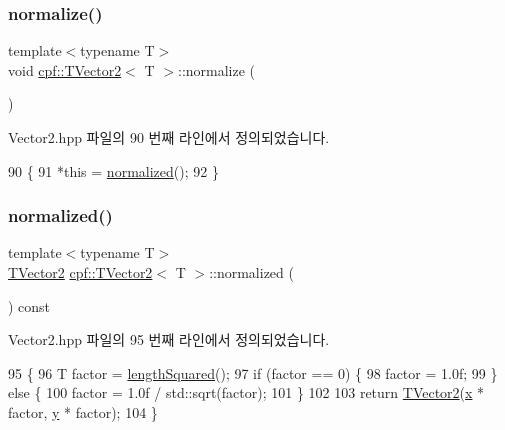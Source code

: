 \subsubsection{\texorpdfstring{normalize()}{normalize()}}
{\footnotesize\ttfamily template$<$typename T$>$ \\
void \hyperlink{classcpf_1_1_t_vector2}{cpf\+::\+T\+Vector2}$<$ T $>$\+::normalize (\begin{DoxyParamCaption}{ }\end{DoxyParamCaption})\hspace{0.3cm}{\ttfamily [inline]}}



Vector2.\+hpp 파일의 90 번째 라인에서 정의되었습니다.


\begin{DoxyCode}
90                          \{
91             *\textcolor{keyword}{this} = \hyperlink{classcpf_1_1_t_vector2_a10ee9140d296273ab65169f0e5671382}{normalized}();
92         \}
\end{DoxyCode}
\mbox{\label{classcpf_1_1_t_vector2_a10ee9140d296273ab65169f0e5671382}} 
\subsubsection{\texorpdfstring{normalized()}{normalized()}}
{\footnotesize\ttfamily template$<$typename T$>$ \\
\hyperlink{classcpf_1_1_t_vector2}{T\+Vector2} \hyperlink{classcpf_1_1_t_vector2}{cpf\+::\+T\+Vector2}$<$ T $>$\+::normalized (\begin{DoxyParamCaption}{ }\end{DoxyParamCaption}) const\hspace{0.3cm}{\ttfamily [inline]}}



Vector2.\+hpp 파일의 95 번째 라인에서 정의되었습니다.


\begin{DoxyCode}
95                                     \{
96             T factor = \hyperlink{classcpf_1_1_t_vector2_a4e7d459775330c569777ede3b1424483}{lengthSquared}();
97             \textcolor{keywordflow}{if} (factor == 0) \{
98                 factor = 1.0f;
99             \} \textcolor{keywordflow}{else} \{
100                 factor = 1.0f / std::sqrt(factor);
101             \}
102 
103             \textcolor{keywordflow}{return} \hyperlink{classcpf_1_1_t_vector2_aaed071ed32aa0e7fb5d8dc15e65aa2e5}{TVector2}(\hyperlink{classcpf_1_1_t_vector2_a2c0ac9258353351f1435070a2307e9e1}{x} * factor, \hyperlink{classcpf_1_1_t_vector2_a727b923b39a876bbb13c810bcf6eecff}{y} * factor);
104         \}
\end{DoxyCode}
\mbox{\label{classcpf_1_1_t_vector2_a16a9e29d378cf8f0cf75be9399318788}} 

